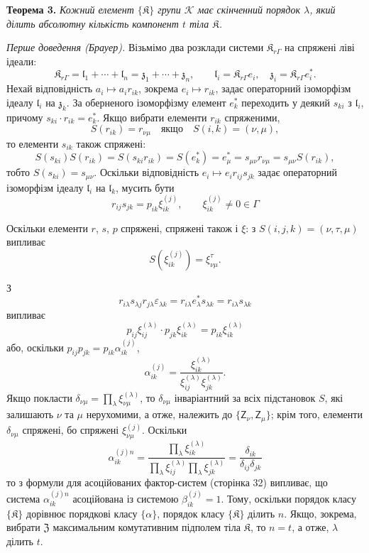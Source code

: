 \documentclass[11pt]{article}
\begin{document}
\textbf{Теорема 3.} \emph{Кожний елемент \(\{\mathfrak K\}\) групи \(\mathscr K\) має скінченний порядок \(\lambda\), який ділить абсолютну кількість компонент \(t\) тіла \(\mathfrak K\).}

\emph{Перше доведення (Брауер).} Візьмімо два розклади системи \(\mathfrak K_{r\Gamma}\) на спряжені ліві ідеали:
\[
\mathfrak K_{r\Gamma}=\mathfrak l_1+\cdots+\mathfrak l_n=\mathfrak z_1+\cdots+\mathfrak z_n,\qquad
\mathfrak l_i=\mathfrak K_{r\Gamma}e_i,\quad
\mathfrak z_i=\mathfrak K_{r\Gamma}e_i^*.
\]
Нехай відповідність \(a_i\mapsto a_ir_{ik}\), зокрема \(e_i\mapsto r_{ik}\), задає операторний ізоморфізм ідеалу \(\mathfrak l_i\) на \(\mathfrak z_k\). За оберненого ізоморфізму елемент \(e_k^*\) переходить у деякий \(s_{ki}\) з \(\mathfrak l_i\), причому \(s_{ki}\cdot r_{ik}=e_k^*\). Якщо вибрати елементи \(r_{ik}\) спряженими,
\[
S(r_{ik})=r_{\nu\mu}\quad\text{якщо}\quad S(i,k)=(\nu,\mu),
\]
то елементи \(s_{ik}\) також спряжені:
\[
S(s_{ki})S(r_{ik})=S(s_{ki}r_{ik})=S(e_k^*)=e_\mu^*
=s_{\mu\nu}r_{\nu\mu}=s_{\mu\nu}S(r_{ik}),
\]
тобто \(S(s_{ki})=s_{\mu\nu}\). Оскільки відповідність \(e_i\mapsto e_ir_{ij}s_{jk}\) задає операторний ізоморфізм ідеалу \(\mathfrak l_i\) на \(\mathfrak l_k\), мусить бути
\[
r_{ij}s_{jk}=p_{ik}\xi_{ik}^{(j)},\qquad
\xi_{ik}^{(j)}\ne0\in\Gamma
\]

Оскільки елементи \(r\), \(s\), \(p\) спряжені, спряжені також і \(\xi\): з \(S(i,j,k)=(\nu,\tau,\mu)\) випливає
\[
S(\xi_{ik}^{(j)})=\xi_{\nu\mu}^{\tau}.
\]

З
\[
r_{i\lambda}s_{\lambda j}r_{j\lambda}\varepsilon_{\lambda k}
=r_{i\lambda}e_\lambda^*s_{\lambda k}
=r_{i\lambda}s_{\lambda k}
\]
випливає
\[
p_{ij}\xi_{ij}^{(\lambda)}\cdot p_{jk}\xi_{ik}^{(\lambda)}
=p_{ik}\xi_{ik}^{(\lambda)}
\]
або, оскільки \(p_{ij}p_{jk}=p_{ik}\alpha_{ik}^{(j)}\),
\[
\alpha_{ik}^{(j)}
=\frac{\xi_{ik}^{(\lambda)}}{\xi_{ij}^{(\lambda)}\xi_{jk}^{(\lambda)}}.
\]
Якщо покласти \(\delta_{\nu\mu}=\prod_{\lambda}\xi_{\nu\mu}^{(\lambda)}\), то \(\delta_{\nu\mu}\) інваріантний за всіх підстановок \(S\), які залишають \(\nu\) та \(\mu\) нерухомими, а отже, належить до \(\{\mathsf{Z}_\nu,\mathsf{Z}_\mu\}\); крім того, елементи \(\delta_{\nu\mu}\) спряжені, бо спряжені \(\xi_{\nu\mu}^{(j)}\). Оскільки
\[
\alpha_{ik}^{(j)n}
=\frac{\prod_{\lambda}\xi_{ik}^{(\lambda)}}
       {\prod_{\lambda}\xi_{ij}^{(\lambda)}\prod_{\lambda}\xi_{jk}^{(\lambda)}}
=\frac{\delta_{ik}}{\delta_{ij}\delta_{jk}}
\]
то з формули для асоційованих фактор-систем (сторінка 32) випливає, що система \(\alpha_{ik}^{(j)n}\) асоційована із системою \(\beta_{ik}^{(j)}=1\). Тому, оскільки порядок класу \(\{\mathfrak K\}\) дорівнює порядкові класу \(\{\alpha\}\), порядок класу \(\{\mathfrak K\}\) ділить \(n\). Якщо, зокрема, вибрати \(\mathfrak Z\) максимальним комутативним підполем тіла \(\mathfrak K\), то \(n=t\), а отже, \(\lambda\) ділить \(t\).
\end{document}
